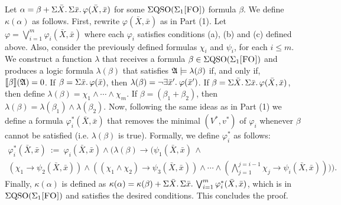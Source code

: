  Let $\alpha = \beta + \Sigma{\bar{X}}.\,\Sigma{\bar{x}}.\, \varphi(\bar{X},\bar{x})$ for some $\Sigma{\rm QSO}(\Sigma_{1}\textsc{[FO]})$ formula $\beta$. We define $\kappa(\alpha)$ as follows.
First, rewrite $\varphi(\bar{X},\bar{x})$ as in Part (1). Let $\varphi = \bigvee_{i = 1}^m\varphi_i(\bar{X},\bar{x})$ where each $\varphi_i$ satisfies conditions (a), (b) and (c) defined above. Also, consider the previously defined formulas $\chi_i$ and $\psi_i$, for each $i \leq m$. 
We construct a function $\lambda$ that receives a formula $\beta \in \Sigma{\rm QSO}(\Sigma_{1}\textsc{[FO]})$ and produces a logic formula $\lambda(\beta)$ that satisfies $\mathfrak{A}\models\lambda(\beta)$ if, and only if, ${\llbracket{}{\beta}\rrbracket}(\mathfrak{A}) = 0$. If $\beta = \Sigma{\bar{x}}.\, \varphi(\bar{x})$, then $\lambda(\beta) = \neg \exists{\bar{x}'}.\: \varphi(\bar{x}')$. If $\beta = \Sigma{\bar{X}}.\,\Sigma{\bar{x}}.\,\varphi(\bar{X},\bar{x})$, then 
define $\lambda(\beta) = \chi_1\wedge \cdots\wedge\chi_m$. If $\beta = (\beta_1 + \beta_2)$, then $\lambda(\beta) = \lambda(\beta_1) \wedge \lambda(\beta_2)$.
Now, following the same ideas as in Part (1) we define a formula $\varphi_i^*(\bar{X},\bar{x})$ that removes the minimal $(V^*, v^*)$ of $\varphi_i$ whenever $\beta$ cannot be satisfied (i.e. $\lambda(\beta)$ is true). Formally, we define $\varphi_i^*$ as follows:
\begin{multline*}
\varphi_i^*(\bar{X},\bar{x}) \ := \ \varphi_i(\bar{X},\bar{x})\wedge\Big(\lambda(\beta)\to\Big(\psi_1(\bar{X},\bar{x})\,\wedge \\
(\chi_1\to\psi_2(\bar{X},\bar{x}))\wedge((\chi_1\wedge\chi_2)\to\psi_3(\bar{X},\bar{x}))\wedge\cdots\wedge(
\bigwedge_{j = 1}^{j = i-1}\chi_j\to\psi_i(\bar{X},\bar{x}))\Big)\Big).
\end{multline*}
Finally, $\kappa(\alpha)$ is defined as $\kappa(\alpha) = \kappa(\beta) + \Sigma{\bar{X}}.\,\Sigma{\bar{x}}.\, \bigvee_{i = 1}^m\varphi_i^*(\bar{X},\bar{x})$, which is in $\Sigma{\rm QSO}(\Sigma_{1}\textsc{[FO]})$ and satisfies the desired conditions. This concludes the proof.